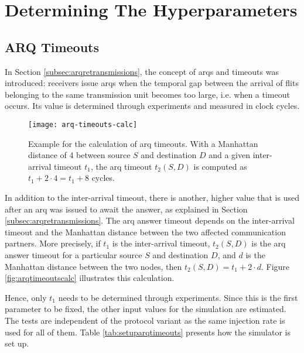 \section{Determining The Hyperparameters}
\subsection{ARQ Timeouts}\label{subsec:arqtimeouts}
In Section \ref{subsec:arqretransmissions}, the concept of \glspl{arq} and timeouts was introduced: receivers issue \glspl{arq} when the temporal gap
between the arrival of flits belonging to the same transmission unit becomes too large, i.e. when a timeout occurs. Its value is determined through
experiments and measured in clock cycles.

\begin{figure}
    \centering
    \texttt{[image: arq-timeouts-calc]}
    \caption[Example of ARQ timeout calculation]{Example for the calculation of \gls{arq} timeouts. With a Manhattan distance of 4 between source $S$ and
    destination $D$ and a given inter-arrival timeout $t_1$, the \gls{arq} timeout $t_2(S, D)$ is computed as $t_1 + 2 \cdot 4 = t_1 + 8$ cycles.}
    \label{fig:arqtimeoutscalc}
\end{figure}

In addition to the inter-arrival timeout, there is another, higher value that is used after an \gls{arq} was issued to await the answer, as explained
in Section \ref{subsec:arqretransmissions}. The \gls{arq} answer timeout depends on the inter-arrival timeout and the Manhattan distance between the
two affected communication partners. More precisely, if $t_1$ is the inter-arrival timeout, $t_2(S, D)$ is the \gls{arq} answer timeout for a
particular source $S$ and destination $D$, and $d$ is the Manhattan distance between the two nodes, then $t_2(S, D) = t_1 + 2 \cdot d$. Figure
\vref{fig:arqtimeoutscalc} illustrates this calculation.

Hence, only $t_1$ needs to be determined through experiments. Since this is the first parameter to be fixed, the other input values for the simulation
are estimated. The tests are independent of the protocol variant as the same injection rate is used for all of them. Table \vref{tab:setuparqtimeouts}
presents how the simulator is set up.


